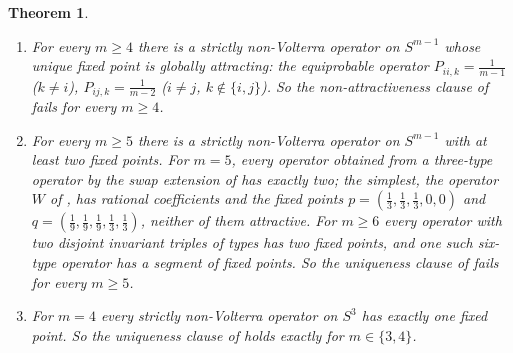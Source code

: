 \documentclass[11pt]{amsart}
\newtheorem{theorem}{Theorem}[section]
\theoremstyle{definition}
\newcommand{\Simp}{S^{m-1}}
\begin{document}
\begin{theorem}\label{thm:main}
\leavevmode
\begin{enumerate}
\item[(i)] For every $m\ge4$ there is a strictly non-Volterra operator on $\Simp$ whose unique fixed point is globally attracting: the equiprobable operator $P_{ii,k}=\frac1{m-1}$ ($k\ne i$), $P_{ij,k}=\frac1{m-2}$ ($i\ne j$, $k\notin\{i,j\}$). So the non-attractiveness clause of  fails for every $m\ge4$.
\item[(ii)] For every $m\ge5$ there is a strictly non-Volterra operator on $\Simp$ with at least two fixed points. For $m=5$, every operator obtained from a three-type operator by the swap extension of  has exactly two; the simplest, the operator $W$ of , has rational coefficients and the fixed points $p=(\frac13,\frac13,\frac13,0,0)$ and $q=(\frac19,\frac19,\frac19,\frac13,\frac13)$, neither of them attractive. For $m\ge6$ every operator with two disjoint invariant triples of types has two fixed points, and one such six-type operator has a segment of fixed points. So the uniqueness clause of  fails for every $m\ge5$.
\item[(iii)] For $m=4$ every strictly non-Volterra operator on $S^3$ has exactly one fixed point. So the uniqueness clause of  holds exactly for $m\in\{3,4\}$.
\end{enumerate}
\end{theorem}
\end{document}
